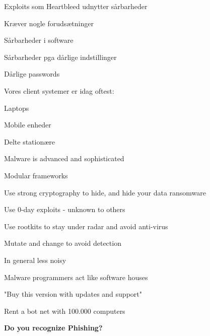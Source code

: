 \documentclass[20pt,landscape,a4paper,footrule]{foils}
\begin{document}

\begin{list1}
\item Exploits som Heartbleed udnytter sårbarheder
\item Kræver nogle forudsætninger
\item Sårbarheder i software
\item Sårbarheder pga dårlige indstillinger
\item Dårlige passwords
\end{list1}


\begin{list1}
\item Vores client systemer er idag oftest:
\item Laptops
\item Mobile enheder
\item Delte stationære
\end{list1}


\begin{list1}
\item Malware is advanced and sophisticated
\item Modular frameworks
\item Use strong cryptography to hide, and hide your data ransomware
\item Use 0-day exploits - unknown to others
\item Use rootkits to stay under radar and avoid anti-virus
\item Mutate and change to avoid detection
\item In general less noisy
\end{list1}



\begin{list1}
\item Malware programmers act like software houses
\item "Buy this version with updates and support"
\item Rent a bot net with 100.000 computers
\end{list1}


\vskip 1cm
\centerline{\bf\LARGE Do you recognize Phishing?}
\end{document}
